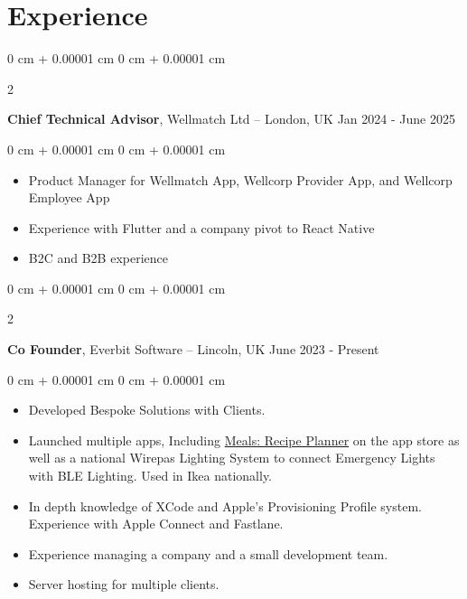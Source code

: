 \documentclass[10pt, letterpaper]{article}
\newenvironment{highlights}{
    \begin{itemize}[
        topsep=0.10 cm,
        parsep=0.10 cm,
        partopsep=0pt,
        itemsep=0pt,
        leftmargin=0 cm + 10pt
    ]
}{
    \end{itemize}
} %
\newenvironment{onecolentry}{
    \begin{adjustwidth}{
        0 cm + 0.00001 cm
    }{
        0 cm + 0.00001 cm
    }
}{
    \end{adjustwidth}
} %
\newenvironment{twocolentry}[2][]{
    \onecolentry
    \def\secondColumn{#2}
    \setcolumnwidth{\fill, 4.5 cm}
    \begin{paracol}{2}
}{
    \switchcolumn \raggedleft \secondColumn
    \end{paracol}
    \endonecolentry
} %
\begin{document}
    
    \section{Experience}

        \begin{twocolentry}{
            Jan 2024 - June 2025
        }
            \textbf{Chief Technical Advisor}, Wellmatch Ltd -- London, UK\end{twocolentry}

        \vspace{0.10 cm}
        \begin{onecolentry}
            \begin{highlights}
                \item Product Manager for Wellmatch App, Wellcorp Provider App, and Wellcorp Employee App
                \item Experience with Flutter and a company pivot to React Native
                \item B2C and B2B experience
            \end{highlights}
        \end{onecolentry}

        \begin{twocolentry}{
            June 2023 - Present
        }
            \textbf{Co Founder}, Everbit Software -- Lincoln, UK\end{twocolentry}

        \vspace{0.10 cm}
        \begin{onecolentry}
            \begin{highlights}
                \item Developed Bespoke Solutions with Clients.
                \item Launched multiple apps, Including \href{https://www.linkedin.com/company/mealsapp/}{Meals: Recipe Planner} on the app store as well as a national Wirepas Lighting System to connect Emergency Lights with BLE Lighting. Used in Ikea nationally.
                \item In depth knowledge of XCode and Apple's Provisioning Profile system. Experience with Apple Connect and Fastlane.
                \item Experience managing a company and a small development team.
                \item Server hosting for multiple clients.
            \end{highlights}
        \end{onecolentry}
        
\end{document}
